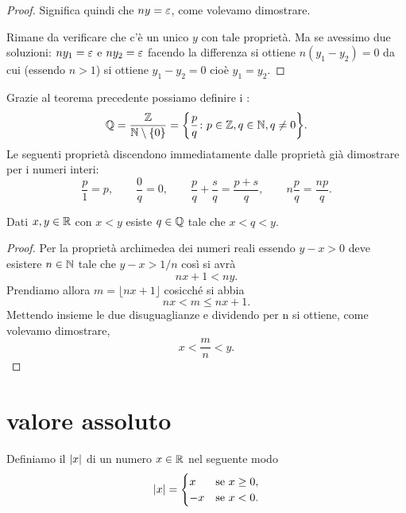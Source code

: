 \begin{proof}
  Significa quindi che $ny = \varepsilon$, come volevamo dimostrare.

  Rimane da verificare che c'è un unico $y$ con tale proprietà. 
  Ma se avessimo due soluzioni: $ny_1 = \varepsilon$ e $ny_2 = \varepsilon$ facendo la differenza 
  si ottiene $n(y_1-y_2)=0$ da cui (essendo $n>1$) si ottiene $y_1-y_2=0$ cioè $y_1=y_2$. 
\end{proof}

Grazie al teorema precedente possiamo definire i :
\[
\mathbb Q = \frac{\mathbb Z}{\mathbb N\setminus{\left\{ 0 \right\}}} 
    = {\left\{ \frac{p}{q}\colon p\in \mathbb Z, q\in \mathbb N, q\neq 0 \right\}}.
\]
Le seguenti proprietà discendono immediatamente dalle proprietà già dimostrare 
per i numeri interi:
\[
  \frac{p}{1} = p, \qquad 
  \frac{0}{q} = 0, \qquad
  \frac{p}{q} + \frac{s}{q} = \frac{p+s}{q},\qquad 
  n \frac{p}{q} = \frac{np}{q}.
\]

\begin{theorem}[densità di $\QQ$ in $\RR$]
\label{th:densita_Q}%
\mymark{*}%
%
Dati $x,y \in \mathbb R$ con $x<y$ esiste $q\in \mathbb Q$ tale che $x<q<y$.
\end{theorem}
%
\begin{proof}
Per la proprietà archimedea dei numeri reali essendo $y-x>0$
deve esistere $n\in \mathbb N$ tale che $y-x > 1/n$ così si avrà
\[
    nx + 1 < ny.
\]
Prendiamo allora $m=\lfloor nx + 1\rfloor$ cosicché si abbia
\[
  nx < m \le nx + 1.
\]
Mettendo insieme le due disuguaglianze e dividendo per n si ottiene,
come volevamo dimostrare,
\[
  x < \frac{m}{n} < y.
\]
\end{proof}

\section{valore assoluto}

\begin{definition}
  \mymark{***}
  Definiamo il  ${\left|x\right|}$ di un numero $x\in \mathbb R$ nel seguente modo
  \[
  {\left|x\right|} =
  \begin{cases}
    x & \text{se $x\ge 0$}, \\
    -x & \text{se $x<0 $}.
  \end{cases}
  \]
  \end{definition}
  
